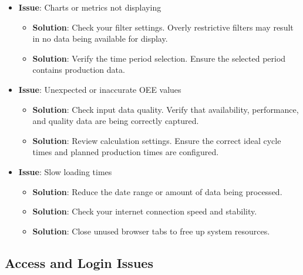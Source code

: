 \documentclass[12pt,a4paper]{report}
\begin{document}
\begin{itemize}
    \item \textbf{Issue}: Charts or metrics not displaying
    \begin{itemize}
        \item \textbf{Solution}: Check your filter settings. Overly restrictive filters may result in no data being available for display.
        \item \textbf{Solution}: Verify the time period selection. Ensure the selected period contains production data.
    \end{itemize}
    
    \item \textbf{Issue}: Unexpected or inaccurate OEE values
    \begin{itemize}
        \item \textbf{Solution}: Check input data quality. Verify that availability, performance, and quality data are being correctly captured.
        \item \textbf{Solution}: Review calculation settings. Ensure the correct ideal cycle times and planned production times are configured.
    \end{itemize}
    
    \item \textbf{Issue}: Slow loading times
    \begin{itemize}
        \item \textbf{Solution}: Reduce the date range or amount of data being processed.
        \item \textbf{Solution}: Check your internet connection speed and stability.
        \item \textbf{Solution}: Close unused browser tabs to free up system resources.
    \end{itemize}
\end{itemize}

\subsection{Access and Login Issues}
\end{document}
